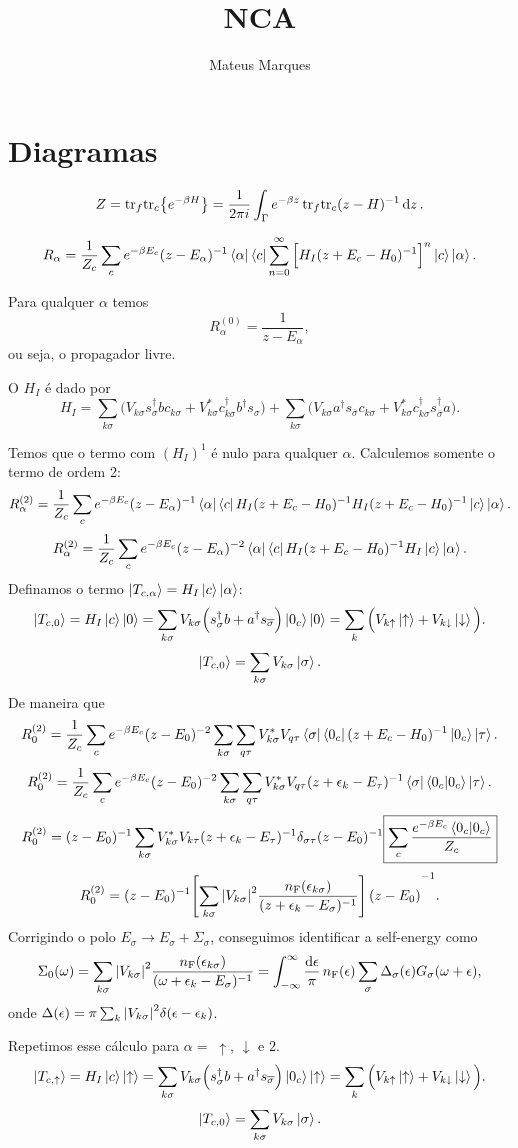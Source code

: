 \documentclass[a4paper,fleqn,12pt]{article}
\title{\Huge{\textbf{NCA}}}
\author{Mateus Marques}
\renewcommand{\tr}{\text{tr}}
\renewcommand{\s}{\sigma}
\newcommand{\us}{\overline{\sigma}}
\renewcommand{\d}{\dagger}
\newcommand{\up}{\uparrow}
\newcommand{\dn}{\downarrow}
\newcommand{\nF}{n_\text{F}}
\begin{document}
\maketitle

\section{Diagramas}

$$
Z = \tr_{f} \tr_{c}\qty{e^{-\beta H}} =
\frac{1}{2\pi i}\int_\Gamma e^{-\beta z} \, \tr_{f} \tr_{c} (z-H)^{-1} \dd{z}.
$$

$$
R_\alpha = \frac{1}{Z_c} \sum_c e^{-\beta E_c} (z-E_\alpha)^{-1} \bra{\alpha}\bra{c}
\sum_{n=0}^\infty \Big[ H_I (z+E_c - H_0)^{-1} \Big]^n \ket{c} \ket{\alpha}.
$$

Para qualquer $\alpha$ temos
$$
R_\alpha^{(0)} = \frac{1}{z - E_\alpha},
$$
ou seja, o propagador livre.

O $H_I$ é dado por
$$
H_I = \sum_{k \s}
\Big(
V_{k\s} s_{\s}^\d b c_{k\s} +
V_{k\s}^* c_{k\s}^\d b^\d s_{\s}
\Big) +
\sum_{k \s}
\Big(
V_{k\s} a^\d s_{\us} c_{k\s} +
V_{k\s}^* c_{k\s}^\d s_{\us}^\d a
\Big).
$$


Temos que o termo com $(H_I)^1$ é nulo para qualquer $\alpha$. Calculemos somente o termo de ordem 2:
$$
R_\alpha^{(2)} = \frac{1}{Z_c} \sum_c e^{-\beta E_c} (z-E_\alpha)^{-1} \bra{\alpha}\bra{c}
H_I (z+E_c - H_0)^{-1} H_I (z+E_c - H_0)^{-1} \ket{c} \ket{\alpha}.
$$
$$
R_\alpha^{(2)} = \frac{1}{Z_c} \sum_c e^{-\beta E_c} (z-E_\alpha)^{-2} \bra{\alpha}\bra{c}
H_I (z+E_c - H_0)^{-1} H_I \ket{c} \ket{\alpha}.
$$
Definamos o termo $\ket{T_{c,\alpha}} = H_I \ket{c} \ket{\alpha}$:
$$
\ket{T_{c,0}} = H_I \ket{c}\ket{0} =
\sum_{k\s} V_{k\s} \Big(
s_{\s}^\d b + a^\d s_{\us}
\Big) \ket{0_c} \ket{0} =
\sum_{k} \Big(
V_{k\up} \ket{\up} + V_{k\dn} \ket{\dn}
\Big).
$$
$$
\ket{T_{c,0}} = \sum_{k\s} V_{k\s} \ket{\sigma}.
$$
De maneira que
$$
R_0^{(2)} = \frac{1}{Z_c} \sum_c e^{-\beta E_c} (z-E_0)^{-2}
\sum_{k\s} \sum_{q\tau} V_{k\s}^* V_{q\tau}
\bra{\sigma} \bra{0_c}
(z+E_c - H_0)^{-1}
\ket{0_c}\ket{\tau}.
$$
$$
R_0^{(2)} = \frac{1}{Z_c} \sum_c e^{-\beta E_c} (z-E_0)^{-2}
\sum_{k\s} \sum_{q\tau} V_{k\s}^* V_{q\tau}
(z + \eps_k - E_\tau)^{-1}
\bra{\sigma} \bra{0_c}
\ket{0_c}\ket{\tau}.
$$
$$
R_0^{(2)} = (z-E_0)^{-1}
\sum_{k\s} V_{k\s}^* V_{k\tau}
(z + \eps_k - E_\tau)^{-1}
\delta_{\s \tau} (z-E_0)^{-1}
\boxed{\sum_c \frac{e^{-\beta E_c }\braket{0_c}{0_c}}{Z_c}}
$$
$$
R_0^{(2)} = (z-E_0)^{-1}
\qty[
\sum_{k\s} \abs{V_{k\s}}^2 \frac{\nF(\eps_{k\s})}{(z + \eps_k - E_\s)^{-1}}
]
(z - E_0)^{-1}.
$$
Corrigindo o polo $E_\s \to E_\s + \Sigma_\s$, conseguimos identificar a self-energy como
$$
\Sigma_0(\omega) =
\sum_{k\s} \abs{V_{k\s}}^2 \frac{\nF(\eps_{k\s})}{(\omega + \eps_k - E_\s)^{-1}} =
\int_{-\infty}^\infty \frac{\dd{\eps}}{\pi} \,
\nF(\eps) \sum_\s \Delta_\s(\eps) G_\s(\omega + \eps),
$$
onde $\Delta(\eps) = \pi \sum_k \abs{V_{k\s}}^2 \delta(\eps - \eps_k)$.

\n

Repetimos esse cálculo para $\alpha = \; \up$, $\dn$ e $2$.
$$
\ket{T_{c,\up}} = H_I \ket{c}\ket{\up} =
\sum_{k\s} V_{k\s} \Big(
s_{\s}^\d b + a^\d s_{\us}
\Big) \ket{0_c} \ket{\up} =
\sum_{k} \Big(
V_{k\up} \ket{\up} + V_{k\dn} \ket{\dn}
\Big).
$$
$$
\ket{T_{c,0}} = \sum_{k\s} V_{k\s} \ket{\sigma}.
$$
\end{document}
